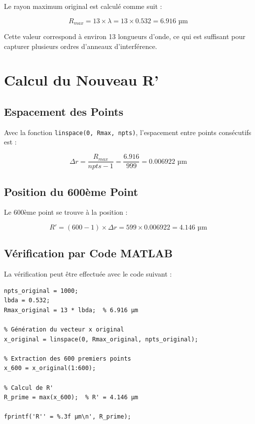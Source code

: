 \documentclass[twocolumn,10pt]{article}
\begin{document}
Le rayon maximum original est calculé comme suit :

\begin{equation}
R_{max} = 13 \times \lambda = 13 \times 0.532 = 6.916 \text{ µm}
\end{equation}

Cette valeur correspond à environ 13 longueurs d'onde, ce qui est suffisant pour capturer plusieurs ordres d'anneaux d'interférence.

\section{Calcul du Nouveau R'}

\subsection{Espacement des Points}

Avec la fonction \texttt{linspace(0, Rmax, npts)}, l'espacement entre points consécutifs est :

\begin{equation}
\Delta r = \frac{R_{max}}{npts - 1} = \frac{6.916}{999} = 0.006922 \text{ µm}
\end{equation}

\subsection{Position du 600ème Point}

Le 600ème point se trouve à la position :

\begin{equation}
R' = (600 - 1) \times \Delta r = 599 \times 0.006922 = 4.146 \text{ µm}
\end{equation}

\subsection{Vérification par Code MATLAB}

La vérification peut être effectuée avec le code suivant :

\begin{lstlisting}[style=matlab, caption=Vérification du calcul de R']
% Paramètres originaux
npts_original = 1000;
lbda = 0.532;
Rmax_original = 13 * lbda;  % 6.916 µm

% Génération du vecteur x original
x_original = linspace(0, Rmax_original, npts_original);

% Extraction des 600 premiers points
x_600 = x_original(1:600);

% Calcul de R'
R_prime = max(x_600);  % R' = 4.146 µm

fprintf('R'' = %.3f µm\n', R_prime);
\end{lstlisting}
\end{document}
